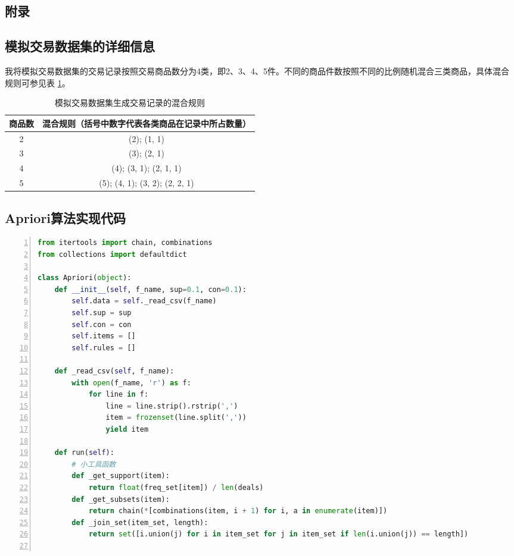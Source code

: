 \documentclass[12pt,a4paper]{article}
\theoremstyle{definition}
\begin{document}
\newpage
\begin{appendix}
	\section{附录}
	\subsection{模拟交易数据集的详细信息}
	\label{apd:dataset}
	
	我将模拟交易数据集的交易记录按照交易商品数分为4类，即2、3、4、5件。不同的商品件数按照不同的比例随机混合三类商品，具体混合规则可参见表 \ref{tab:dataset}。
	
	\begin{table}[H]
		\renewcommand\arraystretch{1.35}
		\caption{模拟交易数据集生成交易记录的混合规则}
		\label{tab:dataset}
		\centering
		
		\begin{tabular}{c|c}
			\centering
			商品数 & 混合规则（括号中数字代表各类商品在记录中所占数量） \\
			\hline
			2 & (2); (1, 1) \\
			3 & (3); (2, 1) \\
			4 & (4); (3, 1); (2, 1, 1) \\
			5 & (5); (4, 1); (3, 2); (2, 2, 1) \\		
		\end{tabular}
	\end{table}
	
	
	\subsection{Apriori算法实现代码}
	\label{apd:code}
	
	\begin{lstlisting}[language=Python,
	numbers=left,
	keywordstyle=\color{blue!70},
	frame=shadowbox,
	breaklines=True]
from itertools import chain, combinations
from collections import defaultdict

class Apriori(object):
    def __init__(self, f_name, sup=0.1, con=0.1):
        self.data = self._read_csv(f_name)
        self.sup = sup
        self.con = con
        self.items = []
        self.rules = []

    def _read_csv(self, f_name):
        with open(f_name, 'r') as f:
            for line in f:
                line = line.strip().rstrip(',')
                item = frozenset(line.split(','))
                yield item

    def run(self):
        # 小工具函数
        def _get_support(item):
            return float(freq_set[item]) / len(deals)
        def _get_subsets(item):
            return chain(*[combinations(item, i + 1) for i, a in enumerate(item)])
        def _join_set(item_set, length):
            return set([i.union(j) for i in item_set for j in item_set if len(i.union(j)) == length])


\end{lstlisting}
\end{appendix}
\end{document}
